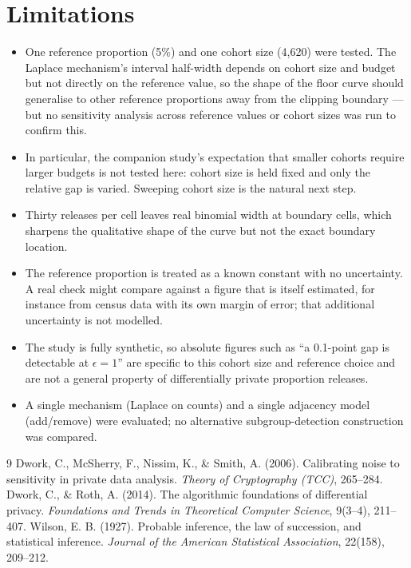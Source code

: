 \documentclass[11pt]{article}
\begin{document}
\section{Limitations}
\begin{itemize}\itemsep0.2em
\item One reference proportion (5\%) and one cohort size (4,620) were tested. The Laplace mechanism's interval half-width depends on cohort size and budget but not directly on the reference value, so the shape of the floor curve should generalise to other reference proportions away from the clipping boundary --- but no sensitivity analysis across reference values or cohort sizes was run to confirm this.
\item In particular, the companion study's expectation that smaller cohorts require larger budgets is not tested here: cohort size is held fixed and only the relative gap is varied. Sweeping cohort size is the natural next step.
\item Thirty releases per cell leaves real binomial width at boundary cells, which sharpens the qualitative shape of the curve but not the exact boundary location.
\item The reference proportion is treated as a known constant with no uncertainty. A real check might compare against a figure that is itself estimated, for instance from census data with its own margin of error; that additional uncertainty is not modelled.
\item The study is fully synthetic, so absolute figures such as ``a 0.1-point gap is detectable at $\epsilon = 1$'' are specific to this cohort size and reference choice and are not a general property of differentially private proportion releases.
\item A single mechanism (Laplace on counts) and a single adjacency model (add/remove) were evaluated; no alternative subgroup-detection construction was compared.
\end{itemize}

\begin{thebibliography}{9}
 Dwork, C., McSherry, F., Nissim, K., \& Smith, A. (2006). Calibrating noise to sensitivity in private data analysis. \emph{Theory of Cryptography (TCC)}, 265--284.
 Dwork, C., \& Roth, A. (2014). The algorithmic foundations of differential privacy. \emph{Foundations and Trends in Theoretical Computer Science}, 9(3--4), 211--407.
 Wilson, E. B. (1927). Probable inference, the law of succession, and statistical inference. \emph{Journal of the American Statistical Association}, 22(158), 209--212.
\end{thebibliography}
\end{document}
